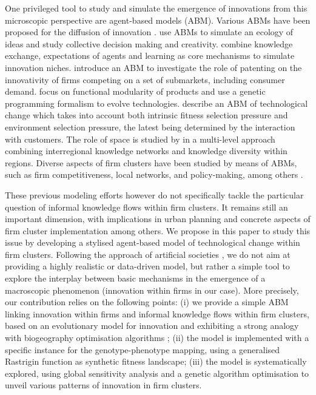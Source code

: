 \documentclass[letterpaper]{article}
\begin{document}
One privileged tool to study and simulate the emergence of innovations from this microscopic perspective are agent-based models (ABM). Various ABMs have been proposed for the diffusion of innovation \citep{kiesling2012agent}. \cite{sayama2015studying} use ABMs to simulate an ecology of ideas and study collective decision making and creativity. \cite{lopolito2013emerging} combine knowledge exchange, expectations of agents and learning as core mechanisms to simulate innovation niches. \cite{dosi2021patents} introduce an ABM to investigate the role of patenting on the innovativity of firms competing on a set of submarkets, including consumer demand. \cite{chen2006functional} focus on functional modularity of products and use a genetic programming formalism to evolve technologies. \cite{ma2005agent} describe an ABM of technological change which takes into account both intrinsic fitness selection pressure and environment selection pressure, the latest being determined by the interaction with customers. The role of space is studied by \cite{vermeulen2018role} in a multi-level approach combining interregional knowledge networks and knowledge diversity within regions. Diverse aspects of firm clusters have been studied by means of ABMs, such as firm competitiveness, local networks, and policy-making, among others \citep{fioretti2005agent}.

These previous modeling efforts however do not specifically tackle the particular question of informal knowledge flows within firm clusters. It remains still an important dimension, with implications in urban planning and concrete aspects of firm cluster implementation among others. We propose in this paper to study this issue by developing a stylised agent-based model of technological change within firm clusters. Following the approach of artificial societies \citep{epstein1997artificial}, we do not aim at providing a highly realistic or data-driven model, but rather a simple tool to explore the interplay between basic mechanisms in the emergence of a macroscopic phenomenon (innovation within firms in our case). More precisely, our contribution relies on the following points: (i) we provide a simple ABM linking innovation within firms and informal knowledge flows within firm clusters, based on an evolutionary model for innovation and exhibiting a strong analogy with biogeography optimisation algorithms \citep{simon2008biogeography}; (ii) the model is implemented with a specific instance for the genotype-phenotype mapping, using a generalised Rastrigin function as synthetic fitness landscape; (iii) the model is systematically explored, using global sensitivity analysis and a genetic algorithm optimisation to unveil various patterns of innovation in firm clusters.
\end{document}
